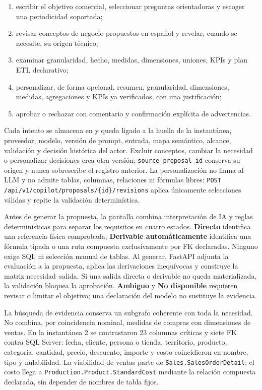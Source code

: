 \documentclass[11pt,letterpaper]{article}
\newcommand{\file}[1]{\texttt{#1}}
\begin{document}
\begin{enumerate}
  \item escribir el objetivo comercial, seleccionar preguntas orientadoras y escoger una periodicidad soportada;
  \item revisar conceptos de negocio propuestos en español y revelar, cuando se necesite, su origen técnico;
  \item examinar granularidad, hecho, medidas, dimensiones, uniones, KPIs y plan ETL declarativo;
  \item personalizar, de forma opcional, resumen, granularidad, dimensiones, medidas, agregaciones y KPIs ya verificados, con una justificación;
  \item aprobar o rechazar con comentario y confirmación explícita de advertencias.
\end{enumerate}

Cada intento se almacena en  y queda ligado a la huella de la instantánea, proveedor, modelo, versión de prompt, entrada, mapa semántico, alcance, validación y decisión histórica del actor. Excluir conceptos, cambiar la necesidad o personalizar decisiones crea otra versión; \file{source\_proposal\_id} conserva su origen y nunca sobrescribe el registro anterior. La personalización no llama al LLM y no admite tablas, columnas, relaciones ni fórmulas libres: \file{POST /api/v1/copilot/proposals/\{id\}/revisions} aplica únicamente selecciones válidas y repite la validación determinística.

Antes de generar la propuesta, la pantalla combina interpretación de IA y reglas determinísticas para separar los requisitos en cuatro estados. \textbf{Directo} identifica una referencia física comprobada; \textbf{Derivable automáticamente} identifica una fórmula tipada o una ruta compuesta exclusivamente por FK declaradas. Ninguno exige SQL ni selección manual de tablas. Al generar, FastAPI adjunta la evaluación a la propuesta, aplica las derivaciones inequívocas y construye la matriz necesidad--salida. Si una salida directa o derivable no queda materializada, la validación bloquea la aprobación. \textbf{Ambiguo} y \textbf{No disponible} requieren revisar o limitar el objetivo; una declaración del modelo no sustituye la evidencia.

La búsqueda de evidencia conserva un subgrafo coherente con toda la necesidad. No combina, por coincidencia nominal, medidas de compras con dimensiones de ventas. En la instantánea 2 se contrastaron 23 columnas críticas y siete FK contra SQL Server: fecha, cliente, persona o tienda, territorio, producto, categoría, cantidad, precio, descuento, importe y costo coincidieron en nombre, tipo y nulabilidad. La viabilidad de ventas parte de \file{Sales.SalesOrderDetail}; el costo llega a \file{Production.Product.StandardCost} mediante la relación compuesta declarada, sin depender de nombres de tabla fijos.
\end{document}
